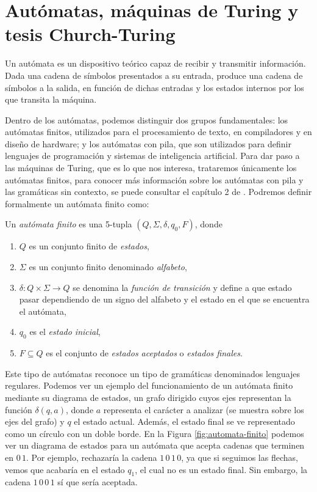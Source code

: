 \section{Autómatas, máquinas de Turing y tesis Church-Turing}
\begin{definition}
    Un autómata es un dispositivo teórico capaz de recibir y transmitir información. Dada una cadena de símbolos presentados a su entrada, produce una cadena de símbolos a la salida, en función de dichas entradas y los estados internos por los que transita la máquina.
\end{definition}
Dentro de los autómatas, podemos distinguir dos grupos fundamentales: los autómatas finitos, utilizados para el procesamiento de texto, en compiladores y en diseño de hardware; y los autómatas con pila, que son utilizados para definir lenguajes de programación y sistemas de inteligencia artificial. Para dar paso a las máquinas de Turing, que es lo que nos interesa, trataremos únicamente los autómatas finitos, para conocer más información sobre los autómatas con pila y las gramáticas sin contexto, se puede consultar el capítulo 2 de \cite{sipser-cc}. Podremos definir formalmente un autómata finito como:
\begin{definition}
    Un \textit{autómata finito} es una 5-tupla $(Q,\Sigma,\delta,q_0,F)$, donde
    \begin{enumerate}
        \item $Q$ es un conjunto finito de \textit{estados},
        \item $\Sigma$ es un conjunto finito denominado \textit{alfabeto},
        \item $\delta:Q\times \Sigma \rightarrow Q$ se denomina la \textit{función de transición} y define a que estado pasar dependiendo de un signo del alfabeto y el estado en el que se encuentra el autómata,
        \item $q_0$ es el \textit{estado inicial},
        \item $F\subseteq Q$ es el conjunto de \textit{estados aceptados} o \textit{estados finales}.
    \end{enumerate}
\end{definition}

Este tipo de autómatas reconoce un tipo de gramáticas denominados lenguajes regulares. Podemos ver un ejemplo del funcionamiento de un autómata finito mediante su diagrama de estados, un grafo dirigido cuyos ejes representan la función $\delta(q,a)$, donde $a$ representa el carácter a analizar (se muestra sobre los ejes del grafo) y $q$ el estado actual. Además, el estado final se ve representado como un círculo con un doble borde. En la Figura \ref{fig:automata-finito} podemos ver un diagrama de estados para un autómata que acepta cadenas que terminen en $0\,1$. Por ejemplo, rechazaría la cadena $1\,0\,1\,0$, ya que si seguimos las flechas, vemos que acabaría en el estado $q_1$, el cual no es un estado final. Sin embargo, la cadena $1\,0\,0\,1$ sí que sería aceptada.

